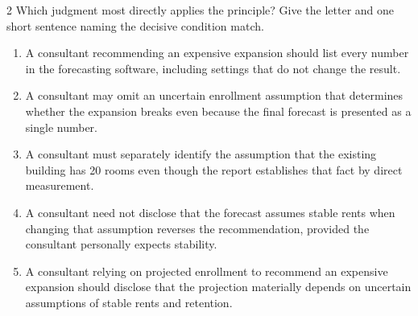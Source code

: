 \documentclass[10pt]{extarticle}
\newcommand{\choice}[1]{\item #1}
\begin{document}
\begin{multicols}{2}
Which judgment most directly applies the principle? Give the letter and one short sentence naming the decisive condition match.
\begin{enumerate}[label=(\alph*)]
  \choice{A consultant recommending an expensive expansion should list every number in the forecasting software, including settings that do not change the result.}
  \choice{A consultant may omit an uncertain enrollment assumption that determines whether the expansion breaks even because the final forecast is presented as a single number.}
  \choice{A consultant must separately identify the assumption that the existing building has 20 rooms even though the report establishes that fact by direct measurement.}
  \choice{A consultant need not disclose that the forecast assumes stable rents when changing that assumption reverses the recommendation, provided the consultant personally expects stability.}
  \choice{A consultant relying on projected enrollment to recommend an expensive expansion should disclose that the projection materially depends on uncertain assumptions of stable rents and retention.}
\end{enumerate}

\end{multicols}
\end{document}
